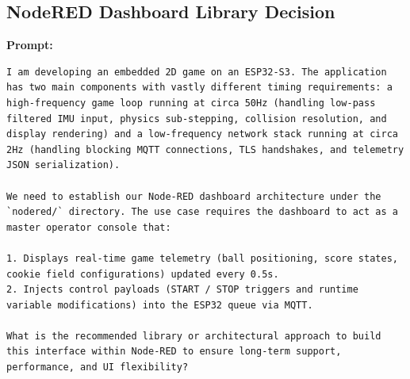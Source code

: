 \subsection{NodeRED Dashboard Library Decision}

\textbf{Prompt:}
\begin{lstlisting}[language={}, breaklines=true]
I am developing an embedded 2D game on an ESP32-S3. The application has two main components with vastly different timing requirements: a high-frequency game loop running at circa 50Hz (handling low-pass filtered IMU input, physics sub-stepping, collision resolution, and display rendering) and a low-frequency network stack running at circa 2Hz (handling blocking MQTT connections, TLS handshakes, and telemetry JSON serialization).

We need to establish our Node-RED dashboard architecture under the `nodered/` directory. The use case requires the dashboard to act as a master operator console that:

1. Displays real-time game telemetry (ball positioning, score states, cookie field configurations) updated every 0.5s.
2. Injects control payloads (START / STOP triggers and runtime variable modifications) into the ESP32 queue via MQTT.

What is the recommended library or architectural approach to build this interface within Node-RED to ensure long-term support, performance, and UI flexibility?
\end{lstlisting}

